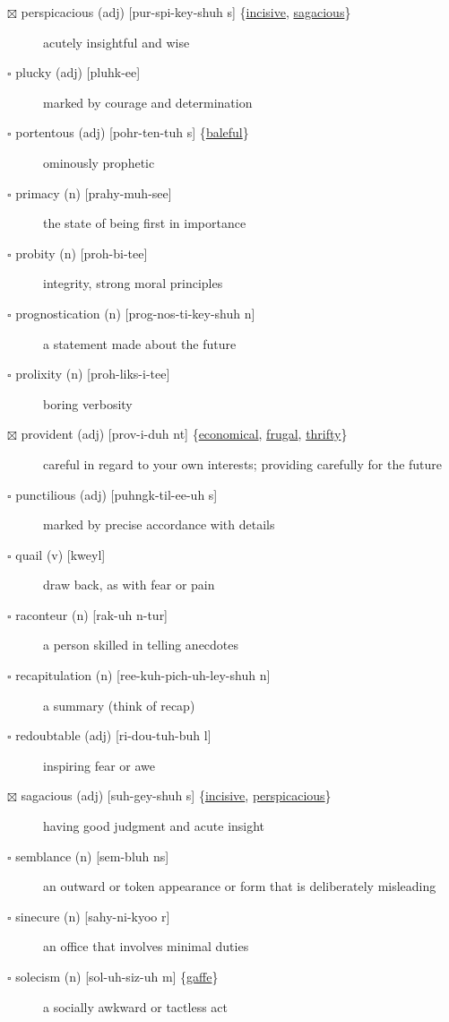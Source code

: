 \documentclass[11pt]{article}
\begin{document}
\begin{description}
\item[{$\boxtimes$ \label{orgff18213}perspicacious (adj) [pur-spi-key-shuh s] \{\hyperref[org090905a]{incisive}, \hyperref[org9352a5d]{sagacious}\}}] acutely insightful and wise
\item[{$\square$ plucky (adj) [pluhk-ee]}] marked by courage and determination
\item[{$\square$ \label{org44acd35}portentous (adj) [pohr-ten-tuh s] \{\hyperref[org9ff4c94]{baleful}\}}] ominously prophetic
\item[{$\square$ primacy (n) [prahy-muh-see]}] the state of being first in importance
\item[{$\square$ probity (n) [proh-bi-tee]}] integrity, strong moral principles
\item[{$\square$ prognostication (n) [prog-nos-ti-key-shuh n]}] a statement made about the future
\item[{$\square$ \label{org2a75510}prolixity (n) [proh-liks-i-tee]}] boring verbosity
\item[{$\boxtimes$ \label{org6590548}provident (adj) [prov-i-duh nt] \{\hyperref[orgcae06d1]{economical}, \hyperref[org0d99c47]{frugal}, \hyperref[org7c1d566]{thrifty}\}}] careful in regard to your own interests; providing carefully for the future
\item[{$\square$ punctilious (adj) [puhngk-til-ee-uh s]}] marked by precise accordance with details
\item[{$\square$ quail (v) [kweyl]}] draw back, as with fear or pain
\item[{$\square$ raconteur (n) [rak-uh n-tur]}] a person skilled in telling anecdotes
\item[{$\square$ recapitulation (n) [ree-kuh-pich-uh-ley-shuh n]}] a summary (think of recap)
\item[{$\square$ redoubtable (adj) [ri-dou-tuh-buh l]}] inspiring fear or awe
\item[{$\boxtimes$ \label{org9352a5d}sagacious (adj) [suh-gey-shuh s] \{\hyperref[org090905a]{incisive}, \hyperref[orgff18213]{perspicacious}\}}] having good judgment and acute insight
\item[{$\square$ semblance (n) [sem-bluh ns]}] an outward or token appearance or form that is deliberately misleading
\item[{$\square$ sinecure (n) [sahy-ni-kyoo r]}] an office that involves minimal duties
\item[{$\square$ \label{orgc319573}solecism (n) [sol-uh-siz-uh m] \{\hyperref[org5dcf63b]{gaffe}\}}] a socially awkward or tactless act

\end{description}
\end{document}
